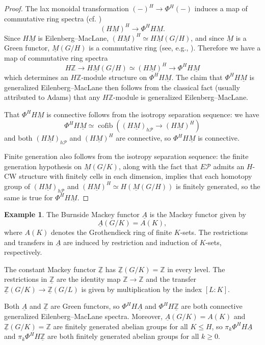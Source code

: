 \documentclass[11pt]{amsart}
\theoremstyle{definition}
\newtheorem{example}[equation]{Example}
\numberwithin{equation}{subsection} %
\def\z{\mathbb{Z}}
\def\uM{\underline{M}}
\def\uA{\underline{A}}
\def\uM{\underline{M}}
\def\cofib{\operatorname{cofib}}
\def\mfz{\underline{\mathbb{Z}}}
\newcommand{\Z}{\mathbb{Z}}
\begin{document}
\begin{proof}
The lax monoidal transformation $(-)^H \to \Phi^H(-)$ induces a map of commutative ring spectra (cf. \cite[\S B.10.5]{HHR16})
$$(H\uM)^H \to \Phi^H H\uM.$$
Since $H\uM$ is Eilenberg--MacLane, $(H\uM)^H \simeq H\uM(G/H)$, and since $\uM$ is a Green functor, $\uM(G/H)$ is a commutative ring (see, e.g., \cite[\S 2.2.5]{Shu10}). Therefore we have a map of commutative ring spectra
$$H\z \to H\uM(G/H) \simeq (H\uM)^H \to \Phi^H H\uM$$
which determines an $H\z$-module structure on $\Phi^H H\uM$. The claim that $\Phi^H H\uM$ is generalized Eilenberg--MacLane then follows from the classical fact (usually attributed to Adams) that any $H\z$-module is generalized Eilenberg--MacLane. 

That $\Phi^H H\uM$ is connective follows from the isotropy separation sequence: we have
$$\Phi^H H\uM \simeq \cofib((H\uM)_{h\mathcal{P}} \to (H\uM)^{H})$$
and both $(H\uM)_{h\mathcal{P}}$ and $(H\uM)^H$ are connective, so $\Phi^H H\uM$ is connective. 

Finite generation also follows from the isotropy separation sequence: the finite generation hypothesis on $\uM(G/K)$, along with the fact that $E\mathcal{P}$ admits an $H$-CW structure with finitely cells in each dimension, implies that each homotopy group of $(H\uM)_{h \mathcal{P}}$ and $(H\uM)^H \simeq H(\uM(G/H))$ is finitely generated, so the same is true for $\Phi^H H\uM$. 
\end{proof}

\begin{example}
The Burnside Mackey functor $\uA$ is the Mackey functor given by 
$$ \uA(G/K)=A(K), $$
where $A(K)$ denotes the Grothendieck ring of finite $K$-sets. The restrictions and transfers in $\uA$ are induced by restriction and induction of $K$-sets, respectively. 

The constant Mackey functor $\mfz$ has $\mfz(G/K)=\Z$ in every level. The restrictions in $\mfz$ are the identity map $\Z\to\Z$ and the transfer $\mfz(G/K)\to\mfz(G/L)$ is given by multiplication by the index $[L:K]$.

Both $\uA$ and $\mfz$ are Green functors, so $\Phi^H H\uA$ and $\Phi^H H\mfz$ are both connective generalized Eilenberg--MacLane spectra. Moreover, $\uA(G/K) = A(K)$ and $\mfz(G/K) = \z$ are finitely generated abelian groups for all $K \leq H$, so $\pi_k \Phi^H H\uA$ and $\pi_k \Phi^H H\mfz$ are both finitely generated abelian groups for all $k\geq 0$. 
\end{example}
\end{document}
